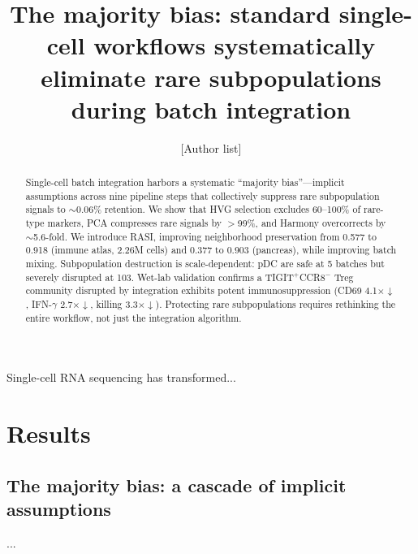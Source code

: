 \documentclass[10pt]{article}
\title{\textbf{The majority bias: standard single-cell workflows systematically eliminate rare subpopulations during batch integration}}
\author{[Author list]}
\date{}
\begin{document}
\maketitle

\begin{abstract}
Single-cell batch integration harbors a systematic ``majority bias''---implicit assumptions across nine pipeline steps that collectively suppress rare subpopulation signals to $\sim$0.06\% retention. We show that HVG selection excludes 60--100\% of rare-type markers, PCA compresses rare signals by $>$99\%, and Harmony overcorrects by $\sim$5.6-fold. We introduce RASI, improving neighborhood preservation from 0.577 to 0.918 (immune atlas, 2.26M cells) and 0.377 to 0.903 (pancreas), while improving batch mixing. Subpopulation destruction is scale-dependent: pDC are safe at 5 batches but severely disrupted at 103. Wet-lab validation confirms a TIGIT$^+$CCR8$^-$ Treg community disrupted by integration exhibits potent immunosuppression (CD69 4.1$\times$$\downarrow$, IFN-$\gamma$ 2.7$\times$$\downarrow$, killing 3.3$\times$$\downarrow$). Protecting rare subpopulations requires rethinking the entire workflow, not just the integration algorithm.
\end{abstract}


Single-cell RNA sequencing has transformed...

\section{Results}

\subsection{The majority bias: a cascade of implicit assumptions}
...
\end{document}
